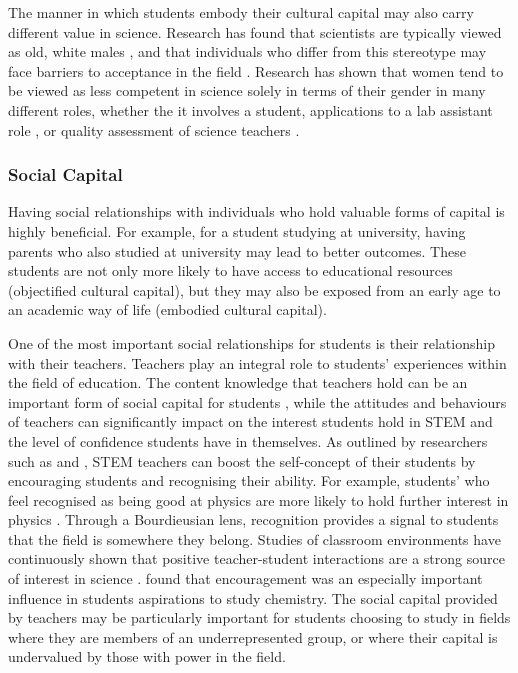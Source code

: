 The manner in which students embody their cultural capital may also carry different value in science. Research has found that scientists are typically viewed as old, white males \cite{Nosek_2009,Barthelemy_2016}, and that individuals who differ from this stereotype may face barriers to acceptance in the field \cite{ong2005body}. Research has shown that women tend to be viewed as less competent in science solely in terms of their gender in many different roles, whether the it involves a student, applications to a lab assistant role \cite{Moss_2012}, or quality assessment of science teachers \cite{Potvin_2016}. 

\subsubsection*{Social Capital}
Having social relationships with individuals who hold valuable forms of capital is highly beneficial. For example, for a student studying at university, having parents who also studied at university may lead to better outcomes. These students are not only more likely to have access to educational resources (objectified cultural capital), but they may also be exposed from an early age to an academic way of life (embodied cultural capital).

One of the most important social relationships for students is their relationship with their teachers. Teachers play an integral role to students' experiences within the field of education. The content knowledge that teachers hold can be an important form of social capital for students \cite{goldhaber2000does,wayne2003teacher,keller2017impact}, while the attitudes and behaviours of teachers can significantly impact on the interest students hold in STEM \cite{keller2017impact} and the level of confidence students have in themselves. As outlined by researchers such as \cite{bandura1986explanatory} and \cite{siegle2007increasing}, STEM teachers can boost the self-concept of their students by encouraging students and recognising their ability. For example, students' who feel recognised as being good at physics are more likely to hold further interest in physics \cite{Hazari2017}. Through a Bourdieusian lens, recognition provides a signal to students that the field is somewhere they belong. Studies of classroom environments have continuously shown that positive teacher-student interactions are a strong source of interest in science \cite{osborne2003attitudes,keller2017impact}. \cite{mujtaba2018students} found that encouragement was an especially important influence in students aspirations to study chemistry. The social capital provided by teachers may be particularly important for students choosing to study in fields where they are members of an underrepresented group, or where their capital is undervalued by those with power in the field.

